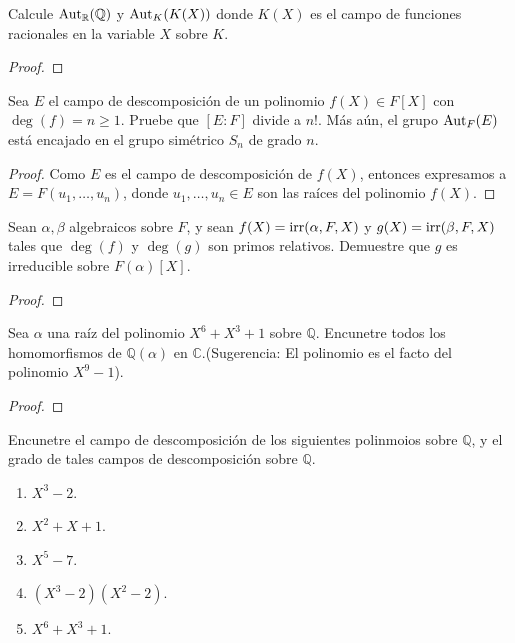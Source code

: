 \documentclass[12pt]{report}
\theoremstyle{largebreak}
\newcommand\aut{\textup{Aut}}
\newcommand\irr{\textup{irr}}
\begin{document}
\begin{excer}
    Calcule $\aut_{\mathbb{R}}(\mathbb{Q})$ y $\aut_{K}(K(X))$ donde $K(X)$ es el campo de funciones racionales en la variable $X$ sobre $K$.
\end{excer}

\begin{proof}
    
\end{proof}

\begin{excer}
    Sea $E$ el campo de descomposición de un polinomio $f(X)\in F[X]$ con $\deg(f)=n\geq1$. Pruebe que $[E:F]$ divide a $n!$. Más aún, el grupo $\textup{Aut}_F(E)$ está encajado en el grupo simétrico $S_n$ de grado $n$.
\end{excer}

\begin{proof}
    Como $E$ es el campo de descomposición de $f(X)$, entonces expresamos a $E=F\left(u_1,\dots,u_n\right)$, donde $u_1,\dots,u_n\in E$ son las raíces del polinomio $f(X)$.
\end{proof}

\begin{excer}
    Sean $\alpha, \beta$ algebraicos sobre $F$, y sean $f(X)=\irr(\alpha, F, X)$ y $g(X)=\irr(\beta, F, X)$ tales que $\deg(f)$ y $\deg(g)$ son primos relativos. Demuestre que $g$ es irreducible sobre $F(\alpha)[X]$.
\end{excer}

\begin{proof}
    
\end{proof}

\begin{excer}
    Sea $\alpha$ una raíz del polinomio $X^6+X^3+1$ sobre $\mathbb{Q}$. Encunetre todos los homomorfismos de $\mathbb{Q}(\alpha)$ en $\mathbb{C}$.(Sugerencia: El polinomio es el facto del polinomio $X^9-1$).
\end{excer}

\begin{proof}
    
\end{proof}

\begin{excer}
    Encunetre el campo de descomposición de los siguientes polinmoios sobre $\mathbb{Q}$, y el grado de tales campos de descomposición sobre $\mathbb{Q}$.
    \begin{enumerate}
        \item $X^3-2$.
        \item $X^2+X+1$.
        \item $X^5-7$.
        \item $(X^3-2)(X^2-2)$.
        \item $X^6+X^3+1$.
    \end{enumerate}
\end{excer}
\end{document}
